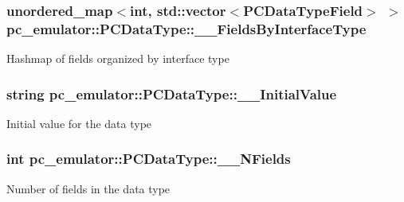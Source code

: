 \subsubsection[{\texorpdfstring{\+\_\+\+\_\+\+Fields\+By\+Interface\+Type}{__FieldsByInterfaceType}}]{\setlength{\rightskip}{0pt plus 5cm}unordered\+\_\+map$<$int, std\+::vector$<${\bf P\+C\+Data\+Type\+Field}$>$ $>$ pc\+\_\+emulator\+::\+P\+C\+Data\+Type\+::\+\_\+\+\_\+\+Fields\+By\+Interface\+Type}\hypertarget{classpc__emulator_1_1PCDataType_a947202be852f43c02ef7bd6a6cc73bcc}{}\label{classpc__emulator_1_1PCDataType_a947202be852f43c02ef7bd6a6cc73bcc}
Hashmap of fields organized by interface type 
\subsubsection[{\texorpdfstring{\+\_\+\+\_\+\+Initial\+Value}{__InitialValue}}]{\setlength{\rightskip}{0pt plus 5cm}string pc\+\_\+emulator\+::\+P\+C\+Data\+Type\+::\+\_\+\+\_\+\+Initial\+Value}\hypertarget{classpc__emulator_1_1PCDataType_aff22e942df6ba861085f1d2e7a0cf91a}{}\label{classpc__emulator_1_1PCDataType_aff22e942df6ba861085f1d2e7a0cf91a}
Initial value for the data type 
\subsubsection[{\texorpdfstring{\+\_\+\+\_\+\+N\+Fields}{__NFields}}]{\setlength{\rightskip}{0pt plus 5cm}int pc\+\_\+emulator\+::\+P\+C\+Data\+Type\+::\+\_\+\+\_\+\+N\+Fields}\hypertarget{classpc__emulator_1_1PCDataType_a11e95666790ef978dbca91e99649acd1}{}\label{classpc__emulator_1_1PCDataType_a11e95666790ef978dbca91e99649acd1}
Number of fields in the data type 
